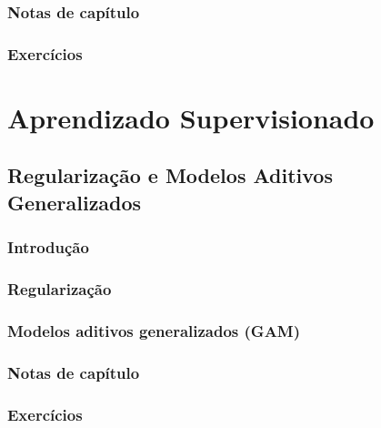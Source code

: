 \documentclass[
]{latex/krantz}
\theoremstyle{definition}
\theoremstyle{definition}
\theoremstyle{definition}
\theoremstyle{definition}
\theoremstyle{remark}
\begin{document}
\hypertarget{notas-de-capuxedtulo-5}{%
\section{Notas de capítulo}\label{notas-de-capuxedtulo-5}}

\hypertarget{exercuxedcios-5}{%
\section{Exercícios}\label{exercuxedcios-5}}

\hypertarget{part-aprendizado-supervisionado}{%
\part{Aprendizado Supervisionado}\label{part-aprendizado-supervisionado}}

\hypertarget{regularizauxe7uxe3o-e-modelos-aditivos-generalizados}{%
\chapter{Regularização e Modelos Aditivos Generalizados}\label{regularizauxe7uxe3o-e-modelos-aditivos-generalizados}}

\hypertarget{introduuxe7uxe3o-6}{%
\section{Introdução}\label{introduuxe7uxe3o-6}}

\hypertarget{regularizauxe7uxe3o}{%
\section{Regularização}\label{regularizauxe7uxe3o}}

\hypertarget{modelos-aditivos-generalizados-gam}{%
\section{Modelos aditivos generalizados (GAM)}\label{modelos-aditivos-generalizados-gam}}

\hypertarget{notas-de-capuxedtulo-6}{%
\section{Notas de capítulo}\label{notas-de-capuxedtulo-6}}

\hypertarget{exercuxedcios-6}{%
\section{Exercícios}\label{exercuxedcios-6}}
\end{document}
